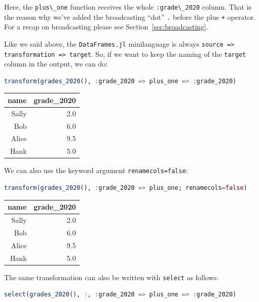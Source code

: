 \documentclass[
  notoc %
]{tufte-book}
\newcommand{\passthrough}[1]{#1}
\begin{document}
Here, the \passthrough{\lstinline!plus\_one!} function receives the
whole \passthrough{\lstinline!:grade\_2020!} column. That is the reason
why we've added the broadcasting ``dot'' \passthrough{\lstinline!.!}
before the plus \passthrough{\lstinline!+!} operator. For a recap on
broadcasting please see Section~\ref{sec:broadcasting}.

Like we said above, the \passthrough{\lstinline!DataFrames.jl!}
minilanguage is always
\passthrough{\lstinline!source => transformation => target!}. So, if we
want to keep the naming of the \passthrough{\lstinline!target!} column
in the output, we can do:

\begin{lstlisting}[language=Julia]
transform(grades_2020(), :grade_2020 => plus_one => :grade_2020)
\end{lstlisting}

\begin{longtable}[]{@{}rr@{}}
\toprule
name & grade\_2020 \\
\midrule
\endhead
Sally & 2.0 \\
Bob & 6.0 \\
Alice & 9.5 \\
Hank & 5.0 \\
\bottomrule
\end{longtable}

We can also use the keyword argument
\passthrough{\lstinline!renamecols=false!}:

\begin{lstlisting}[language=Julia]
transform(grades_2020(), :grade_2020 => plus_one; renamecols=false)
\end{lstlisting}

\begin{longtable}[]{@{}rr@{}}
\toprule
name & grade\_2020 \\
\midrule
\endhead
Sally & 2.0 \\
Bob & 6.0 \\
Alice & 9.5 \\
Hank & 5.0 \\
\bottomrule
\end{longtable}

The same transformation can also be written with
\passthrough{\lstinline!select!} as follows:

\begin{lstlisting}[language=Julia]
select(grades_2020(), :, :grade_2020 => plus_one => :grade_2020)
\end{lstlisting}
\end{document}
